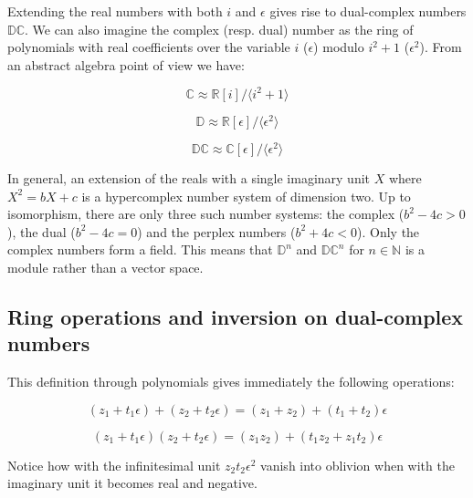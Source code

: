 \documentclass{article}
\newcommand{\N}{\mathbb{N}}
\newcommand{\R}{\mathbb{R}}
\newcommand{\C}{\mathbb{C}}
\newcommand{\D}{\mathbb{D}}
\newcommand{\DC}{\mathbb{DC}}
\newcommand{\e}{\epsilon}
\begin{document}
Extending the real numbers with both $i$ and $\e$ gives rise to dual-complex numbers $\DC$. We can also imagine the complex (resp. dual) number as the ring of polynomials with real coefficients over the variable $i$ ($\e$) modulo $i^2 + 1$ ($\e^2$). From an abstract algebra point of view we have:

\begin{multicols}{3}

\noindent
\begin{equation}
\C \approx \R [i]/\langle i^2+1 \rangle
\end{equation}

\columnbreak

\noindent
\begin{equation}
\D \approx \R [\e]/\langle \e^2 \rangle
\end{equation}

\columnbreak

\noindent
\begin{equation}
\DC \approx \C [\e]/\langle \e^2 \rangle
\end{equation}
\end{multicols}

In general, an extension of the reals with a single imaginary unit $X$ where $X^2 = bX + c$ is a hypercomplex number system of dimension two. Up to isomorphism, there are only three such number systems: the complex ($b^2 - 4c > 0$), the dual ($b^2 - 4c = 0$) and the perplex numbers ($b^2 + 4c < 0$). Only the complex numbers form a field. This means that $\D^n$ and $\DC^n$ for $n \in \N$ is a module rather than a vector space.

\subsection{Ring operations and inversion on dual-complex numbers}

This definition through polynomials gives immediately the following operations:

\begin{equation}
(z_1 + t_1 \e) + (z_2 + t_2 \e) = (z_1 + z_2) + (t_1 + t_2) \e
\end{equation}

\noindent \begin{equation}
(z_1 + t_1 \e) (z_2 + t_2 \e) = (z_1 z_2) + (t_1 z_2 + z_1 t_2) \e
\end{equation}

Notice how with the infinitesimal unit $z_2 t_2 \e^2$ vanish into oblivion when with the imaginary unit it becomes real and negative.
\end{document}
